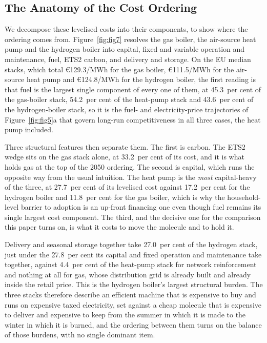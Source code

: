 \subsection{The Anatomy of the Cost Ordering}
\label{sec:results:lcohanatomy}
We decompose these levelised costs into their components, to show where the
ordering comes from. Figure~\ref{fig:fig7} resolves the gas boiler, the air-source
heat pump and the hydrogen boiler into capital, fixed and variable operation and
maintenance, fuel, ETS2 carbon, and delivery and storage. On the EU median stacks,
which total \euro{}129.3/MWh for the gas boiler, \euro{}111.5/MWh for the
air-source heat pump and \euro{}124.8/MWh for the hydrogen boiler, the first
reading is that fuel is the largest single component of every one of them, at
45.3~per cent of the gas-boiler stack, 54.2~per cent of the heat-pump stack and
43.6~per cent of the hydrogen-boiler stack, so it is the fuel- and
electricity-price trajectories of Figure~\ref{fig:fig5}a that govern long-run
competitiveness in all three cases, the heat pump included.

Three structural features then separate them. The first is carbon. The ETS2 wedge sits
on the gas stack alone, at 33.2~per cent of its cost, and it is what holds gas at the
top of the 2050 ordering. The second is capital, which runs the opposite way from the
usual intuition. The heat pump is the \emph{most} capital-heavy of the three, at
27.7~per cent of its levelised cost against 17.2~per cent for the hydrogen boiler and
11.8~per cent for the gas boiler, which is why the household-level barrier to adoption
is an up-front financing one even though fuel remains its single largest cost component.
The third, and the decisive one for the comparison this paper turns on, is what it costs
to move the molecule and to hold it.

Delivery and seasonal storage together take 27.0~per cent of the hydrogen stack, just
under the 27.8~per cent its capital and fixed operation and maintenance take together,
against 4.4~per cent of the heat-pump stack for network reinforcement and nothing at all
for gas, whose distribution grid is already built and already inside the retail price.
This is the hydrogen boiler's largest structural burden. The three stacks therefore
describe an efficient machine that is expensive to buy and runs on expensive taxed
electricity, set against a cheap molecule that is expensive to deliver and expensive to
keep from the summer in which it is made to the winter in which it is burned, and the
ordering between them turns on the balance of those burdens, with no single dominant
item.

